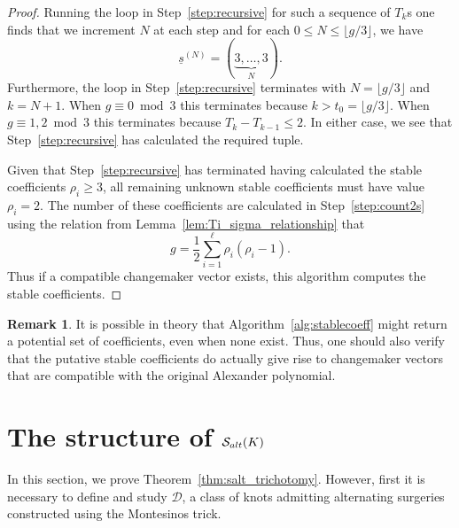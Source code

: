 \documentclass{amsart} %
\newcommand{\D}{\mathcal{D}}
\newcommand{\Salt}{\mathcal{S}_{\rm alt}}
\theoremstyle{thm}
\theoremstyle{definition}
\newtheorem{rem}[Theorem]{Remark}
\numberwithin{equation}{section}
\begin{document}
\begin{proof}
Running the loop in Step~\ref{step:recursive} for such a sequence of $T_k$s one finds that we increment $N$ at each step and for each $0\leq N \leq \lfloor g/3 \rfloor$, we have
\[
\underline{s}^{(N)}=(\underbrace{3, \dots, 3}_{N}).
\]
Furthermore, the loop in Step~\ref{step:recursive} terminates with $N=\lfloor g/3 \rfloor$ and $k=N+1$. When $g\equiv 0\bmod 3$ this terminates because $k>t_0=\lfloor g/3 \rfloor$. When $g\equiv 1,2\bmod 3$ this terminates because $T_k-T_{k-1}\leq 2$. In either case, we see that Step~\ref{step:recursive} has calculated the required tuple.

Given that Step~\ref{step:recursive} has terminated having calculated the stable coefficients $\rho_i\geq 3$, all remaining unknown stable coefficients must have value $\rho_i=2$. The number of these coefficients are calculated in Step~\ref{step:count2s} using the relation from Lemma~\ref{lem:Ti_sigma_relationship} that
\[g = \frac12 \sum_{i=1}^\ell \rho_i(\rho_i-1).\]
Thus if a compatible changemaker vector exists, this algorithm computes the stable coefficients.
\end{proof}
\begin{rem}
    It is possible in theory that Algorithm~\ref{alg:stablecoeff} might return a potential set of coefficients, even when none exist. Thus, one should also verify that the putative stable coefficients do actually give rise to changemaker vectors that are compatible with the original Alexander polynomial.
\end{rem}

\section{The structure of \texorpdfstring{$\Salt(K)$}{Salt(K)}}
In this section, we prove Theorem~\ref{thm:salt_trichotomy}. However, first it is necessary to define and study $\D$, a class of knots admitting alternating surgeries constructed using the Montesinos trick.
\end{document}
